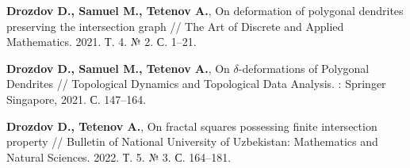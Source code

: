 \begin{thebibliography}{99}








%
    
    
\bigskip \bigskip


\bigskip \bigskip

{\bf Drozdov D., Samuel M., Tetenov A.},
On deformation of polygonal dendrites preserving the intersection graph //
The Art of Discrete and Applied Mathematics. 2021. Т. 4. № 2. С. 1--21.

{\bf Drozdov D., Samuel M., Tetenov A.}, 
On $\delta$-deformations of Polygonal Dendrites // 
Topological Dynamics and Topological Data Analysis. : Springer Singapore, 2021. С. 147--164.

{\bf Drozdov D., Tetenov A.}, 
On fractal squares possessing finite intersection property // 
Bulletin of National University of Uzbekistan: Mathematics and Natural Sciences. 2022. Т. 5. № 3. С. 164--181.


\end{thebibliography}
